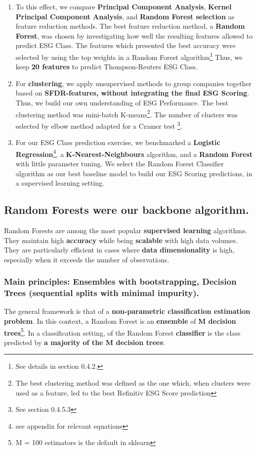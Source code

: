 \documentclass[12pt]{report}
\begin{document}
\begin{enumerate}
    \item To this effect, we compare \textbf{Principal Component Analysis}, \textbf{Kernel Principal Component Analysis}, and \textbf{Random Forest selection} as feature reduction methods. The best feature reduction method, a \textbf{Random Forest}, was chosen by investigating how well the resulting features allowed to predict ESG Class. The features which presented the best accuracy were selected by using the top weights in a Random Forest algorithm\footnote{See details in section 0.4.2.} Thus, we keep \textbf{20 features} to predict Thompson-Reuters ESG Class.
    \item For \textbf{clustering}, we apply unsupervised methods to group companies together based on \textbf{SFDR-features, without integrating the final ESG Scoring}. Thus, we build our own understanding of ESG Performance. The best clustering method was mini-batch K-means\footnote{The best clustering method was defined as the one which, when clusters were used as a feature, led to the best Refinitiv ESG Score prediction}. The number of clusters was selected by elbow method adapted for a Cramer test \footnote{See section 0.4.5.3}.
    \item For our ESG Class prediction exercise, we benchmarked a \textbf{Logistic Regression}\footnote{see appendix for relevant equations}, a \textbf{K-Nearest-Neighbours} algorithm, and a \textbf{Random Forest} with little parameter tuning. We select the Random Forest Classifier algorithm as our best baseline model to build our ESG Scoring predictions, in a supervised learning setting. 
    \end{enumerate}


\subsection{Random Forests were our backbone algorithm.}

Random Forests are among the most popular \textbf{supervised learning} algorithms. They maintain high \textbf{accuracy} while being \textbf{scalable} with high data volumes\cite{scornet}. They are particularly efficient in cases where \textbf{data dimensionality} is high, especially when it exceeds the number of observations.
\subsubsection{Main principles: Ensembles with bootstrapping, Decision Trees (sequential splits with minimal impurity).}
The general framework is that of a \textbf{non-parametric classification estimation problem}. In this context, a Random Forest is an \textbf{ensemble} of \textbf{M decision trees}\footnote{M = 100 estimators is the default in sklearn}. In a classification setting, of the Random Forest \textbf{classifier} is the class predicted by \textbf{a majority of the M decision trees}:\newline 
\end{document}
